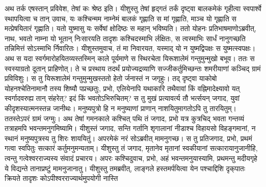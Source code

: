 \vakya अथ तर्क एषस्तान् प्रविवेश, तेषां कः श्रेष्ठ इति।
\vakya यीशुस्तु तेषां हृद्गतं तर्कं दृष्ट्वा बालकमेकं गृहीत्वा स्वपार्श्वे स्थापयित्वा च तान् उवाच, यः कश्चिन्मम नाम्नेमं बालकं गृह्णाति स मां गृह्णाति, माञ्च यो गृह्णाति स मत्प्रेषयितारं गृह्णाति।
\vakya यतो युष्मासु यः सर्वेषां क्षोदिष्ठः स महान् भविष्यति।
\vakya ततो योहनः प्रतिभाषमाणोऽब्रवीत्, नाथ, भवतो नाम्ना यो भूतान् निःसारयति तादृशः कश्चिदस्माभि र्लक्षितः, स त्वस्माभिः सार्धं नानुगच्छति तन्निमित्तं सोऽस्माभि र्निवारितः।
\vakya यीशुस्तमुवाच, तं मा निवारयत, यस्माद् यो न युष्मद्विपक्षः स युष्मत्स्वपक्षः।
\vakya अथ स यदा स्वर्गमारोहयितव्यस्तस्मिन् काले पूर्यमाणे स स्थिरचेता यिरूशालेमं गन्तुमुन्मुखो बभूव।
\vakya ततः स स्वस्याग्रतो दूतान् प्राहिणोत्। ते च प्रस्थाय तदर्थं प्रयोज्यद्रव्याणि सज्जीकर्तुमिच्छन्तः शमरीयाणां कञ्चिद् ग्रामं प्रविविशुः।
\vakya स तु यिरूशालेमं गन्तुमुन्मुखस्ततो हेतो र्जनास्तं न जगृहुः।
\vakya तद् दृष्ट्वा याकोबो योहनश्चेतिनामानौ तस्य शिष्यौ पप्रच्छतुः, प्रभो, एलियेनापि यथाकारि तथैवावां किं वह्निमादेक्ष्यावो यत् स्वर्गादवरुह्य तान् संहरेत्? इदं किं भवतोऽभिरुचितम्?
\vakya स तु मुखं प्रत्यावर्त्य तौ भर्त्सयन् जगाद, युवां कीदृशस्यात्मनस्तन्न जानीथः। मनुष्यपुत्रो हि न मनुष्याणां प्राणान् नाशयितुमागतोऽपि तु तारयितुम्। ततस्तेऽपरं ग्रामं जग्मुः।
\vakya अथ तेषां गमनकाले कश्चित् पथि तं जगाद, प्रभो यत्र कुत्रचिद् भवता गन्तव्यं तत्राहमपि भवन्तमनुगमिष्यामि।
\vakya यीशुस्तं जगाद, सन्ति गर्तानि शृगालानां नीडाश्च विहायसो विहङ्गमानां, न स्थानं मनुष्यपुत्रस्य तु शिरः शाययितुं।
\vakya अपरमेकं नरं सोऽब्रवीत् मामनुगच्छ। स तु प्रतिजगाद, प्रभो, प्रथमं गत्वा स्वपितुः सत्कारं कर्तुमनुमन्यताम्।
\vakya यीशुस्तु तं जगाद, मृतानेव मृतानां स्वकीयानां सत्कारायानुजानीहि, त्वन्तु गत्वेश्वरराज्यस्य संवादं प्रचारय।
\vakya अपरः कश्चिदुवाच, प्रभो, अहं भवन्तमनुयास्यामि, प्रथमन्तु मदीयगृहे ये विद्यन्ते तानाप्रष्टुं मामनुजानातु।
\vakya यीशुस्तु तमब्रवीत्, लाङ्गले हस्तमर्पयित्वा येन पश्चाद्दिशि दृक्‌पातः क्रियते तादृशः कोऽपीश्वरराज्यार्थमुपयोगी नास्ति\eoc